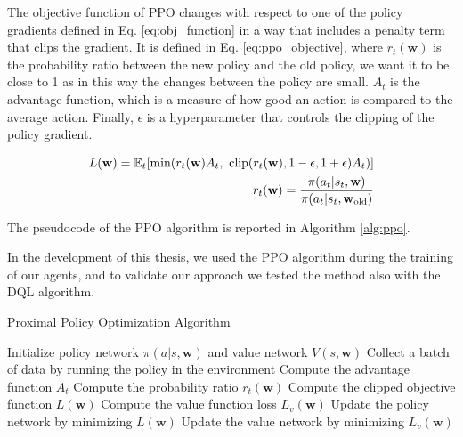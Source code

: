 The objective function of PPO changes with respect to one of the policy gradients defined in Eq. \ref{eq:obj_function} in a way that includes a penalty term that clips the gradient.
It is defined in Eq. \ref{eq:ppo_objective}, where $r_t(\textbf{w})$ is the probability ratio between the new policy and the old policy, we want it to be close to 1 as in this way the changes between the policy are small. 
$A_t$ is the advantage function, which is a measure of how good an action is compared to the average action.
Finally, $\epsilon$ is a hyperparameter that controls the clipping of the policy gradient.

\begin{equation} \label{eq:ppo_objective}
\begin{split}
    L(\textbf{w}) = \E_t [\min( r_t(\textbf{w})A_t, \ \text{clip}(r_t(\textbf{w}), 1-\epsilon, 1+\epsilon)A_t)] \\
    r_t(\textbf{w}) = \frac{\pi(a_t|s_t, \textbf{w})}{\pi(a_t|s_t, \textbf{w}_{\text{old}})}
\end{split}
\end{equation}

The pseudocode of the PPO algorithm is reported in Algorithm \ref{alg:ppo}.



In the development of this thesis, we used the PPO algorithm during the training of our agents, and to validate our approach we tested the method also with the DQL algorithm.



\begin{algorithm}
\caption{Proximal Policy Optimization Algorithm}\label{alg:ppo}
\begin{algorithmic}
\State Initialize policy network $\pi(a|s, \textbf{w})$ and value network $V(s, \textbf{w})$
        \State Collect a batch of data by running the policy in the environment
        \State Compute the advantage function $A_t$
        \State Compute the probability ratio $r_t(\textbf{w})$
        \State Compute the clipped objective function $L(\textbf{w})$
        \State Compute the value function loss $L_v(\textbf{w})$
        \State Update the policy network by minimizing $L(\textbf{w})$
        \State Update the value network by minimizing $L_v(\textbf{w})$
    \EndFor
\EndFor
\end{algorithmic}
\end{algorithm}

